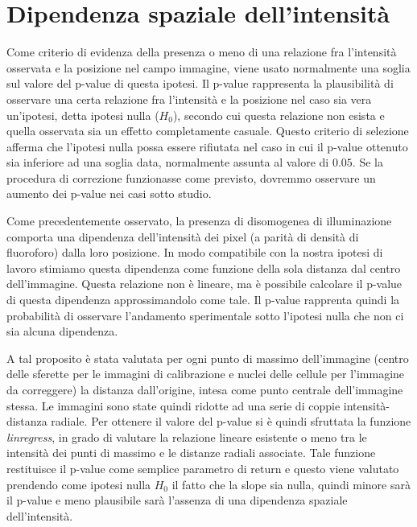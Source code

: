 \section{Dipendenza spaziale dell'intensità}

Come criterio di evidenza della presenza o meno di una relazione fra l'intensità osservata e la posizione nel campo immagine, viene usato normalmente una soglia sul valore del p-value di questa ipotesi.
Il p-value rappresenta la plausibilità di osservare una certa relazione fra l'intensità e la posizione nel caso sia vera un'ipotesi, detta ipotesi nulla ($H_0$), secondo cui questa relazione non esista e quella osservata sia un effetto completamente casuale.
Questo criterio di selezione afferma che l'ipotesi nulla possa essere rifiutata nel caso in cui il p-value ottenuto sia inferiore ad una soglia data, normalmente assunta al valore di $0.05$.
Se la procedura di correzione funzionasse come previsto, dovremmo osservare un aumento dei p-value nei casi sotto studio.

Come precedentemente osservato, la presenza di disomogenea di illuminazione comporta una dipendenza dell'intensità dei pixel (a parità di densità di fluoroforo) dalla loro posizione.
In modo compatibile con la nostra ipotesi di lavoro stimiamo questa dipendenza come funzione della sola distanza dal centro dell'immagine.
Questa relazione non è lineare, ma è possibile calcolare il p-value di questa dipendenza approssimandolo come tale.
Il p-value rapprenta quindi la probabilità di osservare l'andamento sperimentale sotto l'ipotesi nulla che non ci sia alcuna dipendenza.

A tal proposito è stata valutata per ogni punto di massimo dell'immagine (centro delle sferette per le immagini di calibrazione e nuclei delle cellule per l'immagine da correggere) la distanza dall'origine, intesa come punto centrale dell'immagine stessa.
Le immagini sono state quindi ridotte ad una serie di coppie intensità-distanza radiale.
Per ottenere il valore del p-value si è quindi sfruttata la funzione \textit{linregress}, in grado di valutare la relazione lineare esistente o meno tra le intensità dei punti di massimo e le distanze radiali associate.
Tale funzione restituisce il p-value come semplice parametro di return e questo viene valutato prendendo come ipotesi nulla $H_0$ il fatto che la slope sia nulla, quindi minore sarà il p-value e meno plausibile sarà l'assenza di una dipendenza spaziale dell'intensità.

